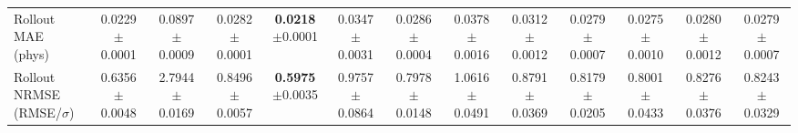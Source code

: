 \begin{table}[t]
{\begin{tabular}{lcccccccccccc}
Rollout MAE (phys) & \makecell{0.0229\\[-2pt]{\scriptsize$\pm$0.0001}} & \makecell{0.0897\\[-2pt]{\scriptsize$\pm$0.0009}} & \makecell{0.0282\\[-2pt]{\scriptsize$\pm$0.0001}} & \makecell{\textbf{0.0218}\\[-2pt]{\scriptsize$\pm$0.0001}} & \makecell{0.0347\\[-2pt]{\scriptsize$\pm$0.0031}} & \makecell{0.0286\\[-2pt]{\scriptsize$\pm$0.0004}} & \makecell{0.0378\\[-2pt]{\scriptsize$\pm$0.0016}} & \makecell{0.0312\\[-2pt]{\scriptsize$\pm$0.0012}} & \makecell{0.0279\\[-2pt]{\scriptsize$\pm$0.0007}} & \makecell{0.0275\\[-2pt]{\scriptsize$\pm$0.0010}} & \makecell{0.0280\\[-2pt]{\scriptsize$\pm$0.0012}} & \makecell{0.0279\\[-2pt]{\scriptsize$\pm$0.0007}} \\
Rollout NRMSE (RMSE/$\sigma$) & \makecell{0.6356\\[-2pt]{\scriptsize$\pm$0.0048}} & \makecell{2.7944\\[-2pt]{\scriptsize$\pm$0.0169}} & \makecell{0.8496\\[-2pt]{\scriptsize$\pm$0.0057}} & \makecell{\textbf{0.5975}\\[-2pt]{\scriptsize$\pm$0.0035}} & \makecell{0.9757\\[-2pt]{\scriptsize$\pm$0.0864}} & \makecell{0.7978\\[-2pt]{\scriptsize$\pm$0.0148}} & \makecell{1.0616\\[-2pt]{\scriptsize$\pm$0.0491}} & \makecell{0.8791\\[-2pt]{\scriptsize$\pm$0.0369}} & \makecell{0.8179\\[-2pt]{\scriptsize$\pm$0.0205}} & \makecell{0.8001\\[-2pt]{\scriptsize$\pm$0.0433}} & \makecell{0.8276\\[-2pt]{\scriptsize$\pm$0.0376}} & \makecell{0.8243\\[-2pt]{\scriptsize$\pm$0.0329}} \\

\end{tabular}}
\end{table}
